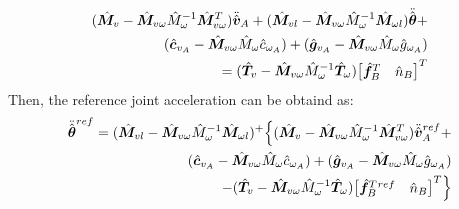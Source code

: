 %
\begin{align}
  ({\hat{\bm{M}}}_{v} - {\hat{\bm{M}}}_{v\omega}\hat{M}_{\omega}^{-1}{\hat{\bm{M}}}_{v\omega}^{T})\ddot{{\hat{\bm{v}}}}_{A} +
  ({\hat{\bm{M}}}_{vl} - {\hat{\bm{M}}}_{v \omega}\hat{M}_{\omega}^{-1}{\hat{\bm{M}}}_{\omega l}){\ddot{\hat{\bm{\theta}}}} +\notag\\
  ({\hat{\bm{c}}}_{v_{A}} - {\hat{\bm{M}}}_{v\omega}\hat{M}_{\omega}\hat{c}_{\omega_{A}}) +
  ({\hat{\bm{g}}}_{v_{A}} - {\hat{\bm{M}}}_{v\omega}\hat{M}_{\omega}\hat{g}_{\omega_{A}})\notag\\
  = ({\hat{\bm{T}}}_{v} - {\hat{\bm{M}}}_{v\omega}\hat{M}_{\omega}^{-1}{\hat{\bm{T}}}_{\omega}){\begin{bmatrix} {\hat{\bm{f}}}_{B}^{T} & \hat{n}_{B} \end{bmatrix}}^{T}
\end{align}
%
Then, the reference joint acceleration can be obtaind as:
%
\begin{align}
  {\ddot{\hat{\bm{\theta}}}}^{ref} =   ({\hat{\bm{M}}}_{vl} - {\hat{\bm{M}}}_{v \omega}\hat{M}_{\omega}^{-1}{\hat{\bm{M}}}_{\omega l})^{+}\Big\{
  ({\hat{\bm{M}}}_{v} - {\hat{\bm{M}}}_{v\omega}\hat{M}_{\omega}^{-1}{\hat{\bm{M}}}_{v\omega}^{T})\ddot{{\hat{\bm{v}}}}_{A}^{ref} +\notag\\
  ({\hat{\bm{c}}}_{v_{A}} - {\hat{\bm{M}}}_{v\omega}\hat{M}_{\omega}\hat{c}_{\omega_{A}}) +
  ({\hat{\bm{g}}}_{v_{A}} - {\hat{\bm{M}}}_{v\omega}\hat{M}_{\omega}\hat{g}_{\omega_{A}})\notag\\
  - ({\hat{\bm{T}}}_{v} - {\hat{\bm{M}}}_{v\omega}\hat{M}_{\omega}^{-1}{\hat{\bm{T}}}_{\omega}){\begin{bmatrix} {\hat{\bm{f}}}_{B}^{T}{}^{ref} & \hat{n}_{B} \end{bmatrix}}^{T}\Big\}
\end{align}
%



